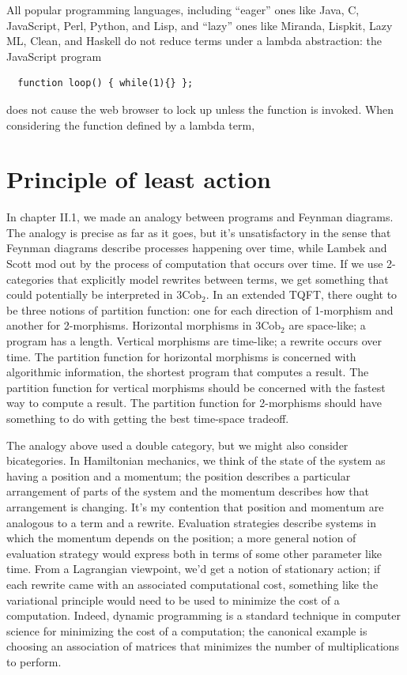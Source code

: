 \documentclass[12pt,twoside,openright]{report}
\newcommand{\Cob}{\mathrm{Cob}}
\begin{document}
All popular programming languages, including ``eager'' ones like Java, C, JavaScript, Perl, Python, and Lisp, and ``lazy'' ones like Miranda, Lispkit, Lazy ML, Clean, and Haskell do not reduce terms under a lambda abstraction: the JavaScript program
\begin{verbatim}
  function loop() { while(1){} };
\end{verbatim}
does not cause the web browser to lock up unless the function is invoked.  When considering the function defined by a lambda term, 

\section*{Principle of least action}

In chapter II.1, we made an analogy between programs and Feynman diagrams.  The analogy is precise as far as it goes, but it's unsatisfactory in the sense that Feynman diagrams describe processes happening over time, while Lambek and Scott mod out by the process of computation that occurs over time.  If we use 2-categories that explicitly model rewrites between terms, we get something that could potentially be interpreted in $3\Cob_2$.  In an extended TQFT, there ought to be three notions of partition function: one for each direction of 1-morphism and another for 2-morphisms.  Horizontal morphisms in $3\Cob_2$ are space-like; a program has a length.  Vertical morphisms are time-like; a rewrite occurs over time.  The partition function for horizontal morphisms is concerned with algorithmic information, the shortest program that computes a result.  The partition function for vertical
morphisms should be concerned with the fastest way to compute a result.  The partition function for 2-morphisms should have something to do with getting the best time-space tradeoff.

The analogy above used a double category, but we might also consider bicategories.  In Hamiltonian mechanics, we think of the state of the system as having a position and a momentum; the position describes a particular arrangement of parts of the system and the momentum describes how that arrangement is changing.  It's my contention that position and momentum are analogous to a term and a rewrite.  Evaluation strategies describe systems in which the momentum depends on the position; a more general notion of evaluation strategy would express both in terms of some other parameter like time.  From a Lagrangian viewpoint, we'd get a notion of stationary action; if each rewrite came with an associated computational cost, something like the variational principle would need to be used to minimize the cost of a computation.  Indeed, dynamic programming is a standard technique in computer science for minimizing the cost of a computation; the canonical example is choosing an association of matrices that minimizes the number of multiplications to perform.
\end{document}
